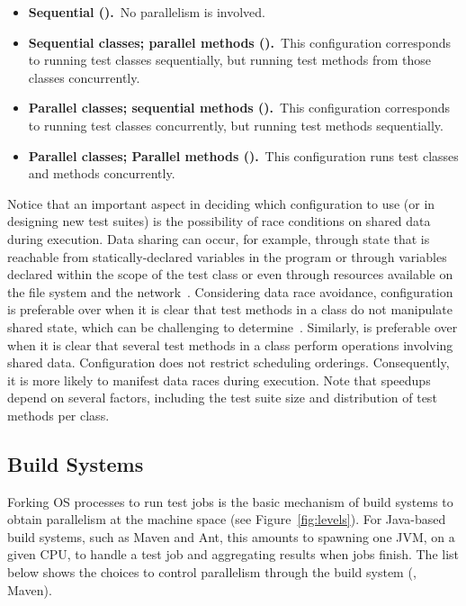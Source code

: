 \begin{itemize}
\item
    \textbf{Sequential (\Seq).}~No parallelism is involved.
\item
    \textbf{Sequential classes; parallel methods
      (\SeqClassParMeth).}~This configuration corresponds to running
    test classes sequentially, but running test methods from those
    classes concurrently.
\item
    \textbf{Parallel classes; sequential methods
      (\ParClassSeqMeth{}).}~This configuration corresponds to running
    test classes concurrently, but running test methods sequentially.
\item
    \textbf{Parallel classes; Parallel methods
      (\ParClassParMeth).}~This configuration runs test classes and
    methods concurrently.
\end{itemize}

Notice that an important aspect in deciding which configuration to use (or in
designing new test suites) is the possibility of race conditions on shared data
during execution.  Data sharing can occur, for example, through state that is
reachable from statically-declared variables in the program or through variables
declared within the scope of the test class or even through resources available
on the file system and the network~\cite{luo-etal-fse2014}.  Considering data
race avoidance, configuration \SeqClassParMeth{} is preferable over
\ParClassSeqMeth{} when it is clear that test methods in a class do not
manipulate shared state, which can be challenging to
determine~\cite{bell-etal-esecfse2015}.  Similarly, \ParClassSeqMeth{} is
preferable over \SeqClassParMeth{} when it is clear that several test methods in
a class perform operations involving shared data.  Configuration
\ParClassParMeth{} does not restrict scheduling orderings.  Consequently, it is
more likely to manifest data races during execution. Note that speedups depend
on several factors, including the test suite size and distribution of test
methods per class.

\subsection{Build Systems}
\label{sec:builder}

Forking OS processes to run test jobs is the basic mechanism of build
systems to obtain parallelism at the machine space (see
Figure~\ref{fig:levels}).  For Java-based build systems, such as Maven
and Ant, this amounts to spawning one JVM, on a given CPU, to handle a
test job and aggregating results when jobs finish.  The list below
shows the choices to control parallelism through the build system
(\eg{}, Maven).

